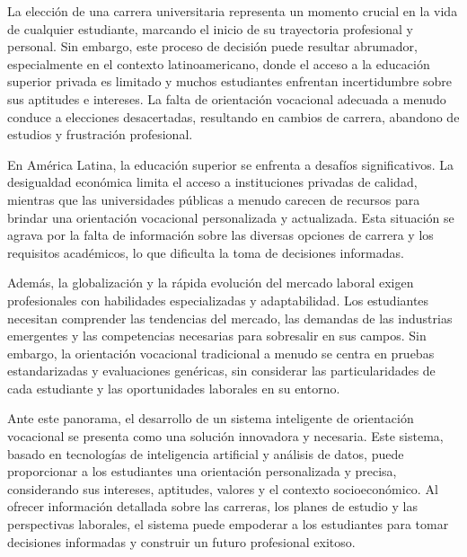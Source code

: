 La elección de una carrera universitaria representa un momento crucial en la vida de cualquier estudiante, marcando el inicio de su trayectoria profesional y personal. Sin embargo, este proceso de decisión puede resultar abrumador, especialmente en el contexto latinoamericano, donde el acceso a la educación superior privada es limitado y muchos estudiantes enfrentan incertidumbre sobre sus aptitudes e intereses. La falta de orientación vocacional adecuada a menudo conduce a elecciones desacertadas, resultando en cambios de carrera, abandono de estudios y frustración profesional.

En América Latina, la educación superior se enfrenta a desafíos significativos. La desigualdad económica limita el acceso a instituciones privadas de calidad, mientras que las universidades públicas a menudo carecen de recursos para brindar una orientación vocacional personalizada y actualizada. Esta situación se agrava por la falta de información sobre las diversas opciones de carrera y los requisitos académicos, lo que dificulta la toma de decisiones informadas.

Además, la globalización y la rápida evolución del mercado laboral exigen profesionales con habilidades especializadas y adaptabilidad. Los estudiantes necesitan comprender las tendencias del mercado, las demandas de las industrias emergentes y las competencias necesarias para sobresalir en sus campos. Sin embargo, la orientación vocacional tradicional a menudo se centra en pruebas estandarizadas y evaluaciones genéricas, sin considerar las particularidades de cada estudiante y las oportunidades laborales en su entorno.

Ante este panorama, el desarrollo de un sistema inteligente de orientación vocacional se presenta como una solución innovadora y necesaria. Este sistema, basado en tecnologías de inteligencia artificial y análisis de datos, puede proporcionar a los estudiantes una orientación personalizada y precisa, considerando sus intereses, aptitudes, valores y el contexto socioeconómico. Al ofrecer información detallada sobre las carreras, los planes de estudio y las perspectivas laborales, el sistema puede empoderar a los estudiantes para tomar decisiones informadas y construir un futuro profesional exitoso.